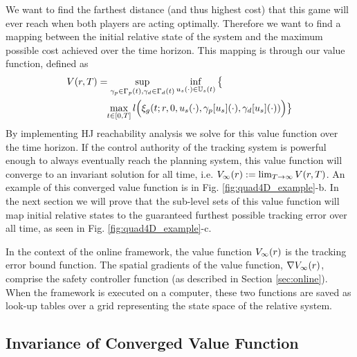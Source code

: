  We want to find the farthest distance (and thus highest cost) that this game will ever reach when both players are acting optimally. Therefore we want to find a mapping between the initial relative state of the system and the maximum possible cost achieved over the time horizon. This mapping is through our value function, defined as
 \begin{equation}
 \begin{aligned}
 \label{eq:valfunc}
 	&V(\rstate,\thor)= \sup_{\gamma_{\pstate} \in \Gamma_\pstate(t), \gamma_{\dstb} \in \Gamma_\dstb(t)} \inf_{\tctrl(\cdot) \in \tcfset(t)} \big\{\\
  &\qquad\qquad \max_{\tvar\in [0, \thor]} \errfunc\Big(\rtraj(\tvar; \rstate, 0, \tctrl(\cdot), \gamma_\pstate[\tctrl](\cdot), \gamma_\dstb[\tctrl](\cdot))\Big)\big\}
 	\end{aligned}
 \end{equation} 
 By implementing HJ reachability analysis we solve for this value function over the time horizon. If the control authority of the tracking system is powerful enough to always eventually reach the planning system, this value function will converge to an invariant solution for all time, i.e. $V_\infty(r) := \lim_{T\rightarrow\infty} V(r, T)$. An example of this converged value function is in Fig. \ref{fig:quad4D_example}-b. In the next section we will prove that the sub-level sets of this value function will map initial relative states to the guaranteed furthest possible tracking error over all time, as seen in Fig. \ref{fig:quad4D_example}-c.
 
In the context of the online framework, the value function $V_\infty(r)$ is the tracking error bound function. The spatial gradients of the value function, $\nabla V_\infty(r)$, comprise the safety controller function (as described in Section \ref{sec:online}). When the framework is executed on a computer, these two functions are saved as look-up tables over a grid representing the state space of the relative system.
 
\subsection{Invariance of Converged Value Function}


